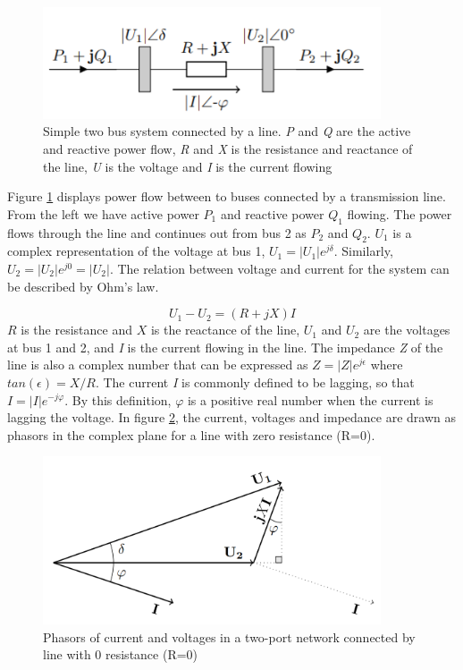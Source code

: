 \documentclass[class=book, crop=false]{standalone}
\begin{document}
\begin{figure}[ht]
    \center
    \includegraphics[width=10cm]{figures/two_bus.PNG}
    \caption[size = 9]
    {Simple two bus system connected by a line. \textit{P} and \textit{Q} are the active and reactive power flow, \textit{R} and \textit{X} is the resistance and reactance of the line, \textit{U} is the voltage and \textit{I} is the current flowing}
	\label{fig:two_bus}
\end{figure}

Figure \ref{fig:two_bus} displays power flow between to buses connected by a transmission line. From the left we have active power $P_{1}$ and reactive power $Q_{1}$ flowing. The power flows through the line and continues out from bus 2 as $P_{2}$ and $Q_{2}$. $U_{1}$ is a complex representation of the voltage at bus 1, $U_{1} = |U_{1}|e^{j\delta}$. Similarly, $U_{2} = |U_{2}|e^{j0} = |U_{2}|$. The relation between voltage and current for the system can be described by Ohm's law.

\begin{equation}\label{eq:chap1_ohm}
    U_{1} - U_{2} = (R + jX)I
\end{equation}
$R$ is the resistance and $X$ is the reactance of the line, $U_{1}$ and $U_{2}$ are the voltages at bus 1 and 2, and \textit{I} is the current flowing in the line. The impedance \textit{Z} of the line is also a complex number that can be expressed as $Z = |Z|e^{j\epsilon}$ where $tan (\epsilon) = X/R$. The current \textit{I} is commonly defined to be lagging, so that $I = |I|e^{-j\varphi}$. By this definition, $\varphi$ is a positive real number when the current is lagging the voltage. In figure \ref{fig:two_bus_phasor}, the current, voltages and impedance are drawn as phasors in the complex plane for a line with zero resistance (R=0).


\begin{figure}[ht!]
    \center
    \includegraphics[width=10cm]{figures/two_bus_phasor.PNG}
    \caption[size = 9]{Phasors of current and voltages in a two-port network connected by line with 0 resistance (R=0)}
	\label{fig:two_bus_phasor}
\end{figure}
\end{document}
